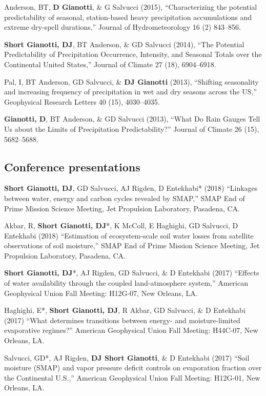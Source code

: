 \documentclass[10pt, a4paper]{article}
\newcommand{\lbr}{\vspace*{4pt}}
\newcommand{\years}[1]{\marginnote{\scriptsize #1}}
\begin{document}
\years{2015a}Anderson, BT, \textbf{D Gianotti}, \& G Salvucci (2015), ``Characterizing the potential predictability of seasonal, station-based heavy precipitation accumulations and extreme dry-spell durations,'' Journal of Hydrometeorology 16 (2) 843--856. \lbr

\years{2014}\textbf{Short Gianotti, DJ}, BT Anderson, \& GD Salvucci (2014), ``The Potential Predictability of Precipitation Occurrence, Intensity, and Seasonal Totals over the Continental United States,'' Journal of Climate 27 (18), 6904--6918. \lbr

\years{2013b}Pal, I, BT Anderson, GD Salvucci, \& \textbf{DJ Gianotti} (2013), ``Shifting seasonality and increasing frequency of precipitation in wet and dry seasons across the US,'' Geophysical Research Letters 40 (15), 4030--4035. \lbr

\years{2013a}\textbf{Gianotti, D}, BT Anderson, \& GD Salvucci (2013), ``What Do Rain Gauges Tell Us about the Limits of Precipitation Predictability?'' Journal of Climate 26 (15), 5682--5688. \lbr

\subsection*{Conference presentations}
\noindent
\years{2018}\textbf{Short Gianotti, DJ}, GD Salvucci, AJ Rigden, D Entekhabi* (2018) ``Linkages between water, energy and carbon cycles revealed by SMAP,'' SMAP End of Prime Mission Science Meeting, Jet Propulsion Laboratory, Pasadena, CA. \lbr %

\years{2018}Akbar, R, \textbf{Short Gianotti, DJ}*, K McColl, E Haghighi, GD Salvucci, D Entekhabi (2018) ``Estimation of ecosystem-scale soil water losses from satellite observations of soil moisture,'' SMAP End of Prime Mission Science Meeting, Jet Propulsion Laboratory, Pasadena, CA. \lbr %

\years{2017}\textbf{Short Gianotti, DJ}*, AJ Rigden, GD Salvucci, \& D Entekhabi (2017) ``Effects of water availability through the coupled land-atmosphere system,'' American Geophysical Union Fall Meeting: H12G-07, New Orleans, LA.\lbr

\years{2017} Haghighi, E*, \textbf{Short Gianotti, DJ}, R Akbar, GD Salvucci, \& D Entekhabi (2017) ``What determines transitions between energy- and moisture-limited evaporative regimes?'' American Geophysical Union Fall Meeting: H44C-07, New Orleans, LA.\lbr

\years{2017}Salvucci, GD*, AJ Rigden, \textbf{DJ Short Gianotti}, \& D Entekhabi (2017) ``Soil moisture (SMAP) and vapor pressure deficit controls on evaporation fraction over the Continental U.S.,'' American Geophysical Union Fall Meeting: H12G-01, New Orleans, LA.\lbr
\end{document}
